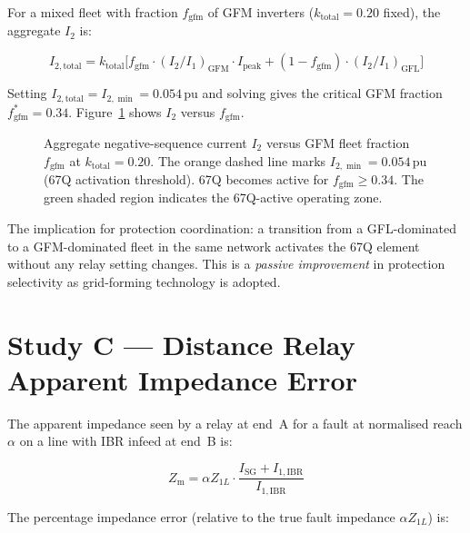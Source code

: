 \documentclass[11pt,a4paper]{article}
\begin{document}
For a mixed fleet with fraction $f_\mathrm{gfm}$ of GFM inverters
($k_\mathrm{total}=0.20$ fixed), the aggregate $I_2$ is:

\begin{equation}
  I_{2,\mathrm{total}} = k_\mathrm{total}
    \bigl[f_\mathrm{gfm}\cdot(I_2/I_1)_\mathrm{GFM}\cdot I_\mathrm{peak}
          + (1-f_\mathrm{gfm})\cdot(I_2/I_1)_\mathrm{GFL}\bigr]
\end{equation}

Setting $I_{2,\mathrm{total}}=I_{2,\min}=0.054$\,pu and solving gives the
critical GFM fraction $f_\mathrm{gfm}^* = 0.34$.  Figure~\ref{fig:i2ratio}
shows $I_2$ versus $f_\mathrm{gfm}$.

\begin{figure}[htbp]
  \centering
  \resizebox{0.86\textwidth}{!}{}
  \caption{Aggregate negative-sequence current $I_2$ versus GFM fleet fraction
           $f_\mathrm{gfm}$ at $k_\mathrm{total}=0.20$.  The orange dashed
           line marks $I_{2,\min}=0.054$\,pu (67Q activation threshold).
           67Q becomes active for $f_\mathrm{gfm}\geq0.34$.  The green shaded
           region indicates the 67Q-active operating zone.}
  \label{fig:i2ratio}
\end{figure}

\noindent
The implication for protection coordination: a transition from a GFL-dominated
to a GFM-dominated fleet in the same network activates the 67Q element without
any relay setting changes.  This is a \emph{passive improvement} in protection
selectivity as grid-forming technology is adopted.

\section{Study C --- Distance Relay Apparent Impedance Error}
\label{sec:studyC}

The apparent impedance seen by a relay at end~A for a fault at normalised
reach $\alpha$ on a line with IBR infeed at end~B is:

\begin{equation}
  Z_\mathrm{m} = \alpha Z_{1L} \cdot \frac{I_\mathrm{SG} + I_{1,\mathrm{IBR}}}{I_{1,\mathrm{IBR}}}
\end{equation}

The percentage impedance error (relative to the true fault impedance
$\alpha Z_{1L}$) is:
\end{document}
